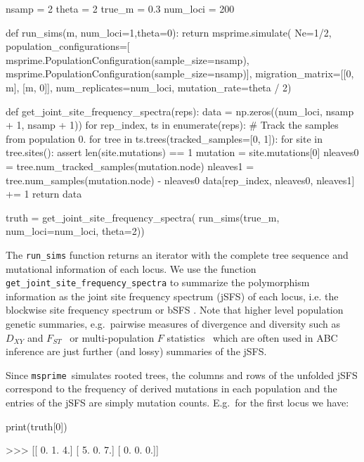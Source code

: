 \documentclass[graybox]{svmult}
\newcommand{\msprime}[0]{\texttt{msprime}}
\begin{document}
\begin{pythoncode}
nsamp = 2
theta = 2
true_m = 0.3
num_loci = 200

def run_sims(m, num_loci=1,theta=0):
    return msprime.simulate(
        Ne=1/2,
        population_configurations=[
            msprime.PopulationConfiguration(sample_size=nsamp),
            msprime.PopulationConfiguration(sample_size=nsamp)],
        migration_matrix=[[0, m], [m, 0]],
        num_replicates=num_loci,
        mutation_rate=theta / 2)

def get_joint_site_frequency_spectra(reps):
    data = np.zeros((num_loci, nsamp + 1, nsamp + 1))
    for rep_index, ts in enumerate(reps):
        # Track the samples from population 0.
        for tree in ts.trees(tracked_samples=[0, 1]):
            for site in tree.sites():
                assert len(site.mutations) == 1
                mutation = site.mutations[0]
                nleaves0 = tree.num_tracked_samples(mutation.node)
                nleaves1 = tree.num_samples(mutation.node) - nleaves0
                data[rep_index, nleaves0, nleaves1] += 1
    return data

truth = get_joint_site_frequency_spectra(
    run_sims(true_m, num_loci=num_loci, theta=2))
\end{pythoncode}

    The \texttt{run\_sims} function returns an iterator with the complete
tree sequence and mutational information of each locus. We use the
function \texttt{get\_joint\_site\_frequency\_spectra} to summarize the
polymorphism information as the joint site frequency spectrum (jSFS) of
each locus, i.e. the blockwise site frequency spectrum
or bSFS \cite[sensu][]{Lohse2016}.
Note that higher level population genetic summaries, e.g.\ pairwise
measures of divergence and diversity such as \(D_{XY}\) \citep{Nei1972} and
\(F_{ST}\)~\citep{wright1950genetical} or multi-population \(F\)
statistics~\citep{Durand2009,patterson2012ancient} which are often
used in ABC inference are just further (and lossy) summaries of the jSFS.

Since \msprime\ simulates rooted trees, the columns and rows
of the unfolded jSFS correspond to the frequency of derived mutations in
each population and the entries of the jSFS are simply mutation counts.
E.g.\ for the first locus we have:
\begin{pythoncode}
print(truth[0])

>>> [[ 0.  1.  4.]
     [ 5.  0.  7.]
     [ 0.  0.  0.]]
\end{pythoncode}
\end{document}
